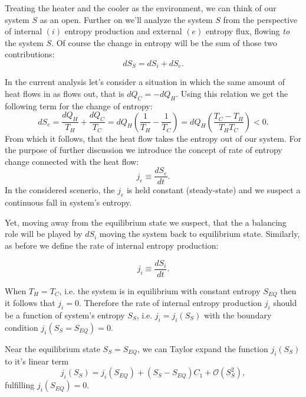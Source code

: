 \documentclass[a4paper,12pt]{article}
\begin{document}
Treating the heater and the cooler as the environment, we can think of our system $S$ as an open.
Further on we'll analyze the system $S$ from the perspective of internal $(i)$ entropy production
and external $(e)$ entropy flux, flowing \emph{to} the system $S$. 
Of course the change in entropy will be the sum of those two contributions:
\begin{equation}
dS_S=dS_i+dS_e.
\label{entrosum}
\end{equation}

In the current analysis let's consider a situation in which the same amount of heat flows in as flows out, that is $dQ_C=-dQ_H$. Using this relation we get the following term for the change of entropy:
\begin{equation}
dS_e=\frac{dQ_H}{T_H}+\frac{dQ_C}{T_C}=dQ_H\left(\frac{1}{T_H}-\frac{1}{T_C}\right)
=dQ_H\left(\frac{T_C-T_H}{T_HT_C}\right)<0.
\label{dSe1}
\end{equation}
From which it follows, that the heat flow takes the entropy out of our system.
For the purpose of further discussion we introduce the concept of rate of entropy change connected with the heat flow:
\begin{equation}
j_e \equiv  \frac{dS_e}{dt}. 
\end{equation}
In the considered scenerio, the $j_e$ is held constant (steady-state) and we suspect a continuous fall in system's entropy.

Yet, moving away from the equilibrium state we suspect, that the a balancing role will be played by $dS_i$ moving the system back to equilibrium state. Similarly, as before we define the rate of internal entropy production:

\begin{equation}
j_i \equiv \frac{dS_i}{dt}.   
\end{equation} 

When $T_H=T_C$, i.e. the system is in equilibrium with constant entropy $S_{EQ}$ then it follows that $j_i=0$.
Therefore the rate of internal entropy production $j_i$ should be a function  of system's entropy $S_S$, i.e. $j_i = j_i(S_S)$ with the boundary condition $j_i(S_S=S_{EQ})=0$. 

Near the equilibrium state $S_S=S_{EQ}$, we can Taylor expand the function $j_i(S_S)$ to it's linear term
\begin{equation}
j_i(S_S)=j_i\left(S_{EQ}\right)+\left(S_S-S_{EQ}\right)C_1+\mathcal{O}\left(S_S^2\right),
\end{equation} 
fulfilling $j_i\left(S_{EQ}\right)=0$. 
\end{document}
